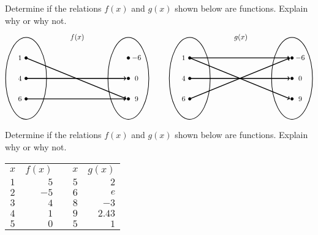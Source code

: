 \documentclass[11pt,letterpaper]{article}
\begin{document}
\prob Determine if the relations $f(x)$ and $g(x)$ shown below are functions. Explain why or why not. 
	\[
	\begin{tikzpicture}
	\node at (2.5,2) {$f(x)$};
	\draw[line width=0.03cm] (0,0) circle (1 and 2);
	\draw[line width=0.03cm] (5,0) circle (1 and 2);
	
	\draw[fill=black] (0,1) circle (0.07);
	\draw[fill=black] (0,0) circle (0.07);
	\draw[fill=black] (0,-1) circle (0.07);
	
	\draw[fill=black] (5,1) circle (0.07);
	\draw[fill=black] (5,0) circle (0.07);
	\draw[fill=black] (5,-1) circle (0.07);
	
	\draw[line width=0.04cm,->] (0,1) -- (4.9,-1);
	\draw[line width=0.04cm,->] (0,0) -- (4.9,0);
	\draw[line width=0.04cm,->] (0,-1) -- (4.9,-1);
	
	\node at (-0.3,1) {$1$};
	\node at (-0.3,0) {$4$};
	\node at (-0.3,-1) {$6$};
	
	\node at (5.4,1) {$-6$};
	\node at (5.4,0) {$0$};
	\node at (5.4,-1) {$9$};
	
	\tikzset{shift={(8,0)}}
	\node at (2.5,2) {$g(x)$};
	\draw[line width=0.03cm] (0,0) circle (1 and 2);
	\draw[line width=0.03cm] (5,0) circle (1 and 2);
	
	\draw[fill=black] (0,1) circle (0.07);
	\draw[fill=black] (0,0) circle (0.07);
	\draw[fill=black] (0,-1) circle (0.07);
	
	\draw[fill=black] (5,1) circle (0.07);
	\draw[fill=black] (5,0) circle (0.07);
	\draw[fill=black] (5,-1) circle (0.07);
	
	\draw[line width=0.04cm,->] (0,1) -- (4.9,-1);
	\draw[line width=0.04cm,->] (0,1) -- (4.9,1);
	\draw[line width=0.04cm,->] (0,0) -- (4.9,0);
	\draw[line width=0.04cm,->] (0,-1) -- (4.9,1);
	
	\node at (-0.3,1) {$1$};
	\node at (-0.3,0) {$4$};
	\node at (-0.3,-1) {$6$};
	
	\node at (5.4,1) {$-6$};
	\node at (5.4,0) {$0$};
	\node at (5.4,-1) {$9$};
	\end{tikzpicture}
	\] \pspace


\prob Determine if the relations $f(x)$ and $g(x)$ shown below are functions. Explain why or why not. 
	\begin{table}[H]
	\centering
	\begin{tabular}{c|rcc|r}
	$x$ & $f(x)$ & \hspace{1cm} & $x$ & $g(x)$ \\ \cline{1-2} \cline{4-5}
	$1$ & $5$ & & $5$ & $2$ \\
	$2$ & $-5$ & & $6$ & $e$ \\
	$3$ & $4$ & & $8$ & $-3$ \\
	$4$ & $1$ & & $9$ & $2.43$ \\
	$5$ & $0$ & & $5$ & $1$
	\end{tabular}
	\end{table} \pspace
\end{document}
